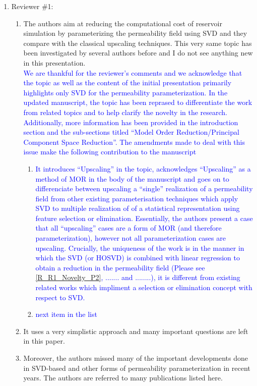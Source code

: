 \documentclass[11pt]{letter} %
\newcommand{\blue}{\textcolor{blue}}
\begin{document}
\begin{letter}
{\begin{enumerate}
  \item Reviewer \#1: \\
    \begin{enumerate}
    \item The authors aim at reducing the computational cost of reservoir simulation by parameterizing the permeability field using SVD and they compare with the classical upscaling techniques. This very same topic has been investigated by several authors before and I do not see anything new in this presentation.\\
      \blue {We are thankful for the reviewer's comments and we acknowledge that the topic as well as the content of the initial presentation primarily highlights only SVD for the permeability parameterization. In the updated manuscript, the topic has been reprased to differentiate the work from related topics and to help clarify the novelty in the research. Additionally, more information has been provided in the introduction section and the sub-sections titled ``Model Order Reduction/Principal Component Space Reduction''. The amendments made to deal with this issue make the following contribution to the manuscript}
      \begin{enumerate}
      \item \blue{It introduces ``Upscaling'' in the topic, acknowledges ``Upscaling'' as a method of MOR in the body of the manuscript and goes on to differenciate between upscaling a ``single'' realization of a permeability field from other existing parameterisation techniques which apply SVD to multiple realization of of a statistical representation using feature selection or elimination. Essentially, the authors present a case that all ``upscaling'' cases are a form of MOR (and therefore parameterization), however not all parameterization cases are upscaling. Crucially, the uniqueness of the work is in the manner in which the SVD (or HOSVD) is combined with linear regression to obtain a reduction in the permeability field (Please see \ref{R_R1_Novelty_P2}, ....... and ........), it is different from existing related works which impliment a selection or elimination concept with respect to SVD.}
        \item \label{R_R1_Novelty_P2} \blue {next item in the list}
      \end{enumerate}
    \item It uses a very simplistic approach and many important questions are left in this paper.
    \item Moreover, the authors missed many of the important developments done in SVD-based and other forms of permeability  parameterization in recent years. The authors are referred to many publications listed here.\\

\end{enumerate}
\end{enumerate}}
\end{letter}
\end{document}

